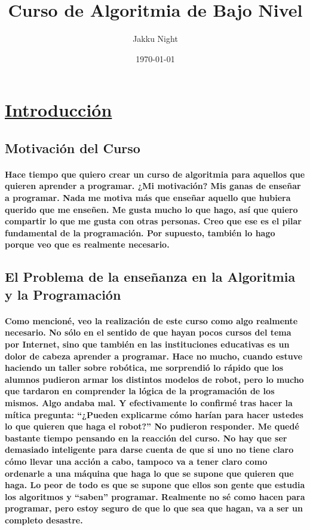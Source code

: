 \documentclass[a4paper, 12pt]{article}
\title{\textbf{Curso de Algoritmia de Bajo Nivel}}
\author{Jakku Night}
\date{\today}
\begin{document}
    \maketitle
    \newpage\section*{\textbf{\underline{Introducción}}}
    \subsection*{\textbf{Motivación del Curso}}
    \paragraph{
        Hace tiempo que quiero crear un curso de algoritmia para aquellos que quieren aprender a programar. 
        ¿Mi motivación? Mis ganas de enseñar a programar. Nada me motiva más que enseñar aquello que hubiera querido que me enseñen. 
        Me gusta mucho lo que hago, así que quiero compartir lo que me gusta con otras personas. Creo que ese es el pilar fundamental de 
        la programación. Por supuesto, también lo hago porque veo que es realmente necesario.
    }
    \subsection*{\textbf{El Problema de la enseñanza en la Algoritmia y la Programación}}
    \paragraph{
        Como mencioné, veo la realización de este curso como algo realmente necesario. No sólo en el sentido de que hayan pocos cursos 
        del tema por Internet, sino que también en las instituciones educativas es un dolor de cabeza aprender a programar. Hace no mucho, 
        cuando estuve haciendo un taller sobre robótica, me sorprendió lo rápido que los alumnos pudieron armar los distintos modelos de robot, 
        pero lo mucho que tardaron en comprender la lógica de la programación de los mismos. Algo andaba mal. Y efectivamente lo confirmé tras 
        hacer la mítica pregunta: ``¿Pueden explicarme cómo harían para hacer ustedes lo que quieren que haga el robot?'' No pudieron responder. 
        Me quedé bastante tiempo pensando en la reacción del curso. No hay que ser demasiado inteligente para darse cuenta de que si uno 
        no tiene claro cómo llevar una acción a cabo, tampoco va a tener claro como ordenarle a una máquina que haga lo que se supone que quieren 
        que haga. Lo peor de todo es que se supone que ellos son gente que estudia los algoritmos y ``saben'' programar. Realmente no sé como 
        hacen para programar, pero estoy seguro de que lo que sea que hagan, va a ser un completo desastre.
    }
\end{document}

